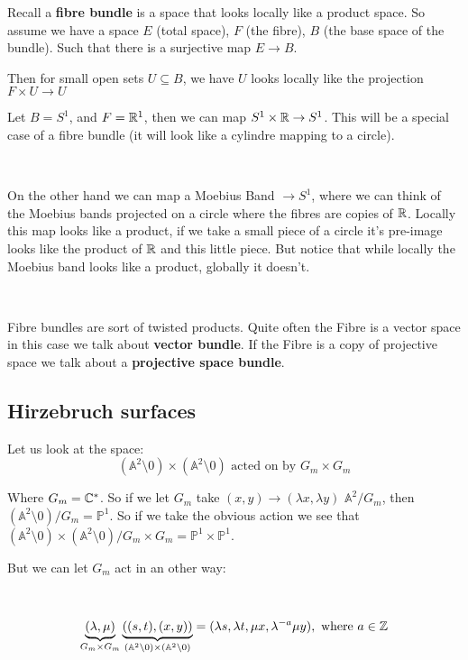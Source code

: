 \begin{definition}
    Recall a \textbf{fibre bundle} is a space that looks locally like a product space. So assume we have a space $E$ (total space), $F$ (the fibre), $B$ (the base space of the bundle). Such that there is a surjective map $E\rightarrow B$.

    Then for small open sets $U\subseteq B$, we have $U$ looks locally like the projection $F\times U\rightarrow U$
\begin{example}
    Let $B = S^1$, and $F = \mathbb{R}^1$, then we can map $S^1\times \mathbb{R} \rightarrow S^1$. This will be a special case of a fibre bundle (it will look like a cylindre mapping to a circle).

    \

    On the other hand we can map a Moebius Band $\rightarrow S^1$, where we can think of the Moebius bands projected on a circle where the fibres are copies of $\mathbb{R}$. Locally this map looks like a product, if we take a small piece of a circle it's pre-image looks like the product of $\mathbb{R}$ and this little piece. But notice that while locally the Moebius band looks like a product, globally it doesn't.
\end{example}

\

Fibre bundles are sort of twisted products. Quite often the Fibre is a vector space in this case we talk about \textbf{vector bundle}. If the Fibre is a copy of projective space we talk about a \textbf{projective space bundle}.
\end{definition}

\subsection{Hirzebruch surfaces}
Let us look at the space:\[(\mathbb{A}^2\setminus 0)\times(\mathbb{A}^2\setminus 0) \text{ acted on by }G_m\times G_m\]

Where $G_m = \mathbb{C}^\ast$. So if we let $G_m$ take $(x,y)\rightarrow (\lambda x,\lambda y)$ $\mathbb{A}^2/G_m$, then $(\mathbb{A}^2\setminus 0)/G_m = \mathbb{P}^1$. So if we take the obvious action we see that $(\mathbb{A}^2\setminus 0)\times(\mathbb{A}^2\setminus 0)/G_m\times G_m = \mathbb{P}^1\times \mathbb{P}^1$.

But we can let $G_m$ act in an other way:

\

\[\underbrace{(\lambda,\mu)}_{G_m\times G_m}\underbrace{((s,t),(x,y))}_{(\mathbb{A}^2\setminus 0)\times(\mathbb{A}^2\setminus 0)} = (\lambda s, \lambda t, \mu x, \lambda^{-a}\mu y), \text{ where }a\in \mathbb{Z}\]


